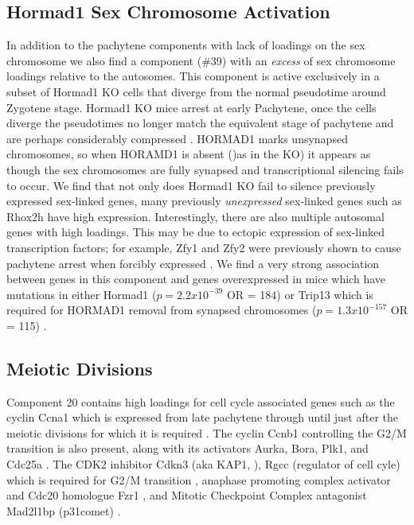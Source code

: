 \subsection{Hormad1 Sex Chromosome Activation}
In addition to the pachytene components with lack of loadings on the sex chromosome we also find a component (\#39) with an \textit{excess} of sex chromosome loadings relative to the autosomes. This component is active exclusively in a subset of Hormad1 KO cells that diverge from the normal pseudotime around Zygotene stage. Hormad1 KO mice arrest at early Pachytene, once the cells diverge the pseudotimes no longer match the equivalent stage of pachytene and are perhaps considerably compressed \parencite{Shin2010Hormad1}. HORMAD1 marks unsynapsed chromosomes, so when HORAMD1 is absent ()as in the KO) it appears as though the sex chromosomes are fully synapsed and transcriptional silencing fails to occur. We find that not only does Hormad1 KO fail to silence previously expressed sex-linked genes, many previously \textit{unexpressed} sex-linked genes such as Rhox2h have high expression. Interestingly, there are also multiple autosomal genes with high loadings. This may be due to ectopic expression of sex-linked transcription factors; for example, Zfy1 and Zfy2 were previously shown to cause pachytene arrest when forcibly expressed \cite{Royo2010Evidence}. We find a very strong association between genes in this component and genes overexpressed in mice which have mutations in either Hormad1 ($p = 2.2x10^{-39}$ OR = 184) or Trip13 which is required for HORMAD1 removal from synapsed chromosomes ($p = 1.3x10^{-157}$ OR = 115) \cite{Ortega2016Surveillance, Wojtasz2009Mouse}.


\subsection{Meiotic Divisions}
Component 20 contains high loadings for cell cycle associated genes such as the cyclin Ccna1 which is expressed from late pachytene through until just after the meiotic divisions \parencite{Sweeney1996distinct} for which it is required \parencite{Liu1998Cyclin}. The cyclin Ccnb1 controlling the G2/M transition is also present, along with its activators Aurka, Bora, Plk1, and Cdc25a \parencite[Reviewed in ]{Joukov2018AuroraPLK1}. The CDK2 inhibitor Cdkn3 (aka KAP1, \parencite{Poon1995Dephosphorylation}), Rgcc (regulator of cell cyle) which is required for G2/M transition \parencite{Saigusa2007RGC32}, anaphase promoting complex activator and Cdc20 homologue Fzr1 \parencite{Holt2014APC}, and Mitotic Checkpoint Complex antagonist Mad2l1bp (p31comet) \parencite{Habu2002Identification}.

